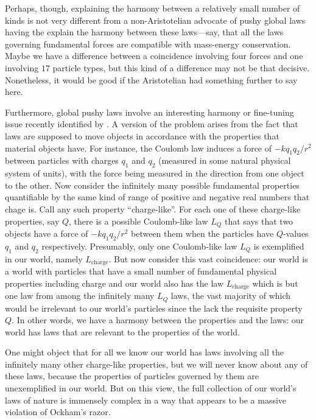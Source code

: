 Perhaps, though, explaining the harmony between a relatively small number of kinds is not very different from 
a non-Aristotelian advocate of pushy global laws having the explain the harmony between these laws---say, that 
all the laws governing fundamental forces are compatible with mass-energy conservation. Maybe we have a difference
between a coincidence involving four forces and one involving $17$ particle types, but this kind of a difference 
may not be that decisive. Nonetheless, it would be good if the Aristotelian had something further to say here.

Furthermore, global pushy laws involve an interesting harmony or fine-tuning issue recently identified by 
. A version 
of the problem arises from the fact that laws are supposed to move objects in accordance with the properties that 
material objects have. For instance, the Coulomb law induces a force of $-k q_1 q_2/r^2$ between particles with charges 
$q_1$ and $q_2$ (measured in some natural physical system of units), with the force being measured in the direction from 
one object to the other. Now consider the infinitely many possible 
fundamental properties quantifiable by the same kind of range of positive and negative real numbers
that chage is. Call any such property ``charge-like''. 
For each one of these
charge-like properties, say $Q$, there is a possible 
Coulomb-like law $L_Q$ that says that two objects have a force of $-k q_1 q_2/r^2$ between them when the particles have 
$Q$-values $q_1$ and $q_2$ respectively. Presumably, only one Coulomb-like law $L_Q$ is exemplified in our world, namely
$L_{\text{charge}}$. But now consider this vast coincidence: our world is a world with particles that have a small
number of fundamental physical properties including charge and our world also has the law $L_{\text{charge}}$ which is 
but one law from among the infinitely many $L_Q$ laws, the vast majority of which would be irrelevant to our world's 
particles since the lack the requisite property $Q$. In other words, we have a harmony between the properties and the laws: our world has laws that are relevant 
to the properties of the world.

One might object that for all we know our world has laws involving all the infinitely many other charge-like properties,
but we will never know about any of these laws, because the properties of particles governed by them are unexemplified
in our world. But on this view, the full collection of our world's laws of nature is immensely complex in a way that 
appears to be a massive violation of Ockham's razor. 


